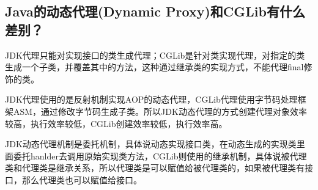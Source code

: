 \documentclass[../../../interview-questions.tex]{subfiles}
\begin{document}
\subsection{Java的动态代理(Dynamic Proxy)和CGLib有什么差别？}

JDK代理只能对实现接口的类生成代理；CGLib是针对类实现代理，对指定的类生成一个子类，并覆盖其中的方法，这种通过继承类的实现方式，不能代理final修饰的类。

JDK代理使用的是反射机制实现AOP的动态代理，CGLib代理使用字节码处理框架ASM，通过修改字节码生成子类。所以JDK动态代理的方式创建代理对象效率较高，执行效率较低，CGLib创建效率较低，执行效率高。

JDK动态代理机制是委托机制，具体说动态实现接口类，在动态生成的实现类里面委托hanlder去调用原始实现类方法，CGLib则使用的继承机制，具体说被代理类和代理类是继承关系，所以代理类是可以赋值给被代理类的，如果被代理类有接口，那么代理类也可以赋值给接口。
\end{document}

